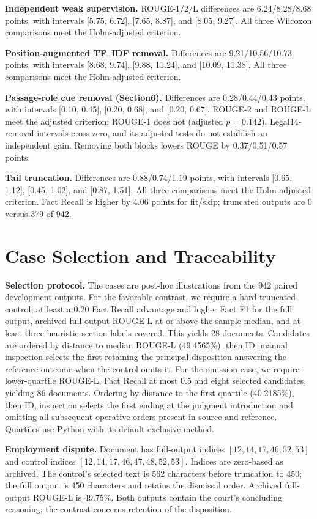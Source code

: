 \documentclass[10pt,twocolumn,letterpaper]{article}
\begin{document}
\textbf{Independent weak supervision.} ROUGE-1/2/L differences are 6.24/8.28/8.68 points, with intervals [5.75, 6.72], [7.65, 8.87], and [8.05, 9.27]. All three Wilcoxon comparisons meet the Holm-adjusted criterion.

\textbf{Position-augmented TF--IDF removal.} Differences are 9.21/10.56/10.73 points, with intervals [8.68, 9.74], [9.88, 11.24], and [10.09, 11.38]. All three comparisons meet the Holm-adjusted criterion.

\textbf{Passage-role cue removal (Section6).} Differences are 0.28/0.44/0.43 points, with intervals [0.10, 0.45], [0.20, 0.68], and [0.20, 0.67]. ROUGE-2 and ROUGE-L meet the adjusted criterion; ROUGE-1 does not (adjusted $p=0.142$). Legal14-removal intervals cross zero, and its adjusted tests do not establish an independent gain. Removing both blocks lowers ROUGE by 0.37/0.51/0.57 points.

\textbf{Tail truncation.} Differences are 0.88/0.74/1.19 points, with intervals [0.65, 1.12], [0.45, 1.02], and [0.87, 1.51]. All three comparisons meet the Holm-adjusted criterion. Fact Recall is higher by 4.06 points for fit/skip; truncated outputs are 0 versus 379 of 942.


\section{Case Selection and Traceability}\label{appendix-i-cases}
\textbf{Selection protocol.} The cases are post-hoc illustrations from the 942 paired development outputs. For the favorable contrast, we require a hard-truncated control, at least a 0.20 Fact Recall advantage and higher Fact F1 for the full output, archived full-output ROUGE-L at or above the sample median, and at least three heuristic section labels covered. This yields 28 documents. Candidates are ordered by distance to median ROUGE-L (49.4565\%), then ID; manual inspection selects the first retaining the principal disposition answering the reference outcome when the control omits it. For the omission case, we require lower-quartile ROUGE-L, Fact Recall at most 0.5 and eight selected candidates, yielding 86 documents. Ordering by distance to the first quartile (40.2185\%), then ID, inspection selects the first ending at the judgment introduction and omitting all subsequent operative orders present in source and reference. Quartiles use Python  with its default exclusive method.

\textbf{Employment dispute.} Document  has full-output indices $[12,14,17,46,52,53]$ and control indices $[12,14,17,46,47,48,52,53]$. Indices are zero-based as archived. The control's selected text is 562 characters before truncation to 450; the full output is 450 characters and retains the dismissal order. Archived full-output ROUGE-L is 49.75\%. Both outputs contain the court's concluding reasoning; the contrast concerns retention of the disposition.
\end{document}
